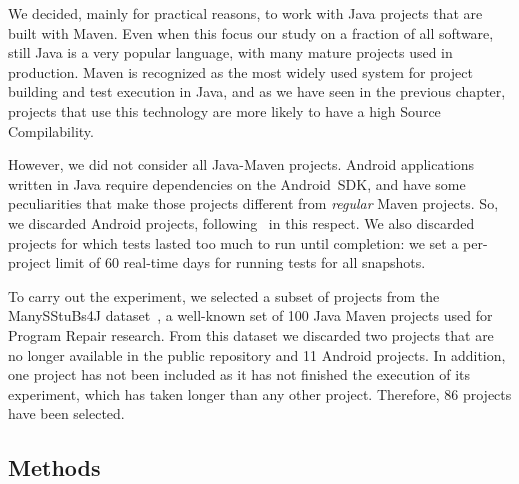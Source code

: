 
We decided, mainly for practical reasons, to work with Java projects that are built with Maven. 
Even when this focus our study on a fraction of all software, still Java is a very popular language, with many mature projects used in production. 
Maven is recognized as the most widely used system for project building and test execution in Java, and as we have seen in the previous chapter, projects that use this technology are more likely to have a high Source Compilability.

However, we did not consider all Java-Maven projects. 
Android applications written in Java require dependencies on the Android~SDK, and have some peculiarities that make those projects different from \textit{regular} Maven projects. 
So, we discarded Android projects, following~\cite{Sulir:2016:QSJ:3001878.3001882} in this respect. 
We also discarded projects for which tests lasted too much to run until completion: we set a per-project limit of 60 real-time days for running tests for all snapshots.


To carry out the experiment, we selected a subset of projects from the ManySStuBs4J dataset~\cite{karampatsis2020often}, a well-known set of 100 Java Maven projects used for Program Repair research.
From this dataset we discarded two projects that are no longer available in the public repository and 11 Android projects. 
In addition, one project has not been included as it has not finished the execution of its experiment, which has taken longer than any other project.
Therefore, 86 projects have been selected.

\subsection{Methods}
\label{subsec:methods}

